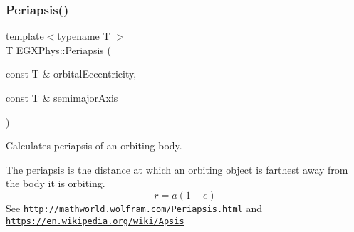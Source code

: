 \subsubsection{\texorpdfstring{Periapsis()}{Periapsis()}}
{\footnotesize\ttfamily template$<$typename T $>$ \\
T E\+G\+X\+Phys\+::\+Periapsis (\begin{DoxyParamCaption}\item[{const T \&}]{orbital\+Eccentricity,  }\item[{const T \&}]{semimajor\+Axis }\end{DoxyParamCaption})}



Calculates periapsis of an orbiting body. 

The periapsis is the distance at which an orbiting object is farthest away from the body it is orbiting. \[r=a(1-e)\] See \href{http://mathworld.wolfram.com/Periapsis.html}{\tt http\+://mathworld.\+wolfram.\+com/\+Periapsis.\+html} and \href{https://en.wikipedia.org/wiki/Apsis}{\tt https\+://en.\+wikipedia.\+org/wiki/\+Apsis}


